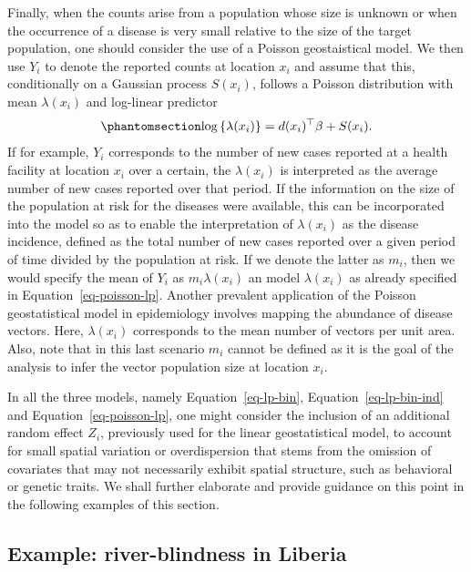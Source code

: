 \documentclass[
  letterpaper,
]{krantz}
\begin{document}
Finally, when the counts arise from a population whose size is unknown
or when the occurrence of a disease is very small relative to the size
of the target population, one should consider the use of a Poisson
geostaistical model. We then use \(Y_i\) to denote the reported counts
at location \(x_i\) and assume that this, conditionally on a Gaussian
process \(S(x_i)\), follows a Poisson distribution with mean
\(\lambda(x_i)\) and log-linear predictor
\begin{equation}\phantomsection\label{eq-poisson-lp}{
\log\left\{\lambda(x_i)\right\} = d(x_i)^\top \beta + S(x_i). 
}\end{equation} If for example, \(Y_i\) corresponds to the number of new
cases reported at a health facility at location \(x_i\) over a certain,
the \(\lambda(x_i)\) is interpreted as the average number of new cases
reported over that period. If the information on the size of the
population at risk for the diseases were available, this can be
incorporated into the model so as to enable the interpretation of
\(\lambda(x_i)\) as the disease incidence, defined as the total number
of new cases reported over a given period of time divided by the
population at risk. If we denote the latter as \(m_i\), then we would
specify the mean of \(Y_i\) as \(m_i\lambda(x_i)\) an model
\(\lambda(x_i)\) as already specified in Equation~\ref{eq-poisson-lp}.
Another prevalent application of the Poisson geostatistical model in
epidemiology involves mapping the abundance of disease vectors. Here,
\(\lambda(x_i)\) corresponds to the mean number of vectors per unit
area. Also, note that in this last scenario \(m_i\) cannot be defined as
it is the goal of the analysis to infer the vector population size at
location \(x_i\).

In all the three models, namely Equation~\ref{eq-lp-bin},
Equation~\ref{eq-lp-bin-ind} and Equation~\ref{eq-poisson-lp}, one might
consider the inclusion of an additional random effect \(Z_i\),
previously used for the linear geostatistical model, to account for
small spatial variation or overdispersion that stems from the omission
of covariates that may not necessarily exhibit spatial structure, such
as behavioral or genetic traits. We shall further elaborate and provide
guidance on this point in the following examples of this section.

\subsection{Example: river-blindness in
Liberia}\label{sec-liberia-estim1}
\end{document}
